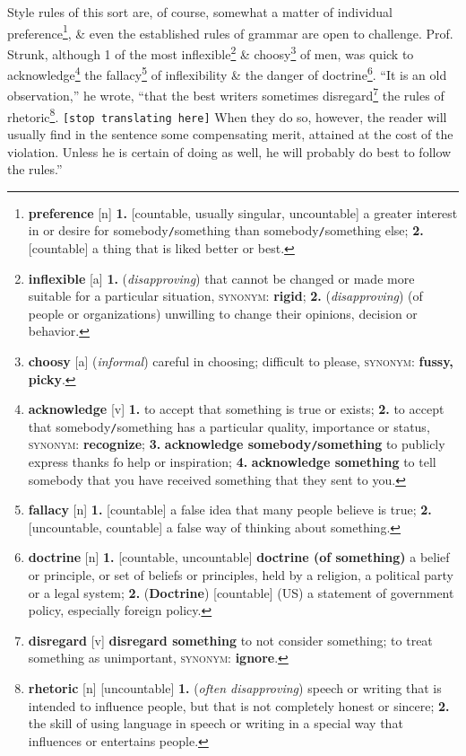 \documentclass[oneside]{book}
\numberwithin{equation}{section}
\begin{document}
Style rules of this sort are, of course, somewhat a matter of individual preference\footnote{\textbf{preference} [n] \textbf{1.} [countable, usually singular, uncountable] a greater interest in or desire for somebody\texttt{/}something than somebody\texttt{/}something else; \textbf{2.} [countable] a thing that is liked better or best.}, \& even the established rules of grammar are open to challenge. Prof. Strunk, although 1 of the most inflexible\footnote{\textbf{inflexible} [a] \textbf{1.} (\textit{disapproving}) that cannot be changed or made more suitable for a particular situation, \textsc{synonym}: \textbf{rigid}; \textbf{2.} (\textit{disapproving}) (of people or organizations) unwilling to change their opinions, decision or behavior.} \& choosy\footnote{\textbf{choosy} [a] (\textit{informal}) careful in choosing; difficult to please, \textsc{synonym}: \textbf{fussy, picky}.} of men, was quick to acknowledge\footnote{\textbf{acknowledge} [v]  \textbf{1.} to accept that something is true or exists; \textbf{2.} to accept that somebody\texttt{/}something has a particular quality, importance or status, \textsc{synonym}: \textbf{recognize}; \textbf{3.} \textbf{acknowledge somebody\texttt{/}something} to publicly express thanks fo help or inspiration; \textbf{4.} \textbf{acknowledge something} to tell somebody that you have received something that they sent to you.} the fallacy\footnote{\textbf{fallacy} [n] \textbf{1.} [countable] a false idea that many people believe is true; \textbf{2.} [uncountable, countable] a false way of thinking about something.} of inflexibility \& the danger of doctrine\footnote{\textbf{doctrine} [n] \textbf{1.} [countable, uncountable] \textbf{doctrine (of something)} a belief or principle, or set of beliefs or principles, held by a religion, a political party or a legal system; \textbf{2.} (\textbf{Doctrine}) [countable] (US) a statement of government policy, especially foreign policy.}. ``It is an old observation,'' he wrote, ``that the best writers sometimes disregard\footnote{\textbf{disregard} [v] \textbf{disregard something} to not consider something; to treat something as unimportant, \textsc{synonym}: \textbf{ignore}.} the rules of rhetoric\footnote{\textbf{rhetoric} [n] [uncountable] \textbf{1.} (\textit{often disapproving}) speech or writing that is intended to influence people, but that is not completely honest or sincere; \textbf{2.} the skill of using language in speech or writing in a special way that influences or entertains people.}. \texttt{[stop translating here]} When they do so, however, the reader will usually find in the sentence some compensating merit, attained at the cost of the violation. Unless he is certain of doing as well, he will probably do best to follow the rules.''
\end{document}
